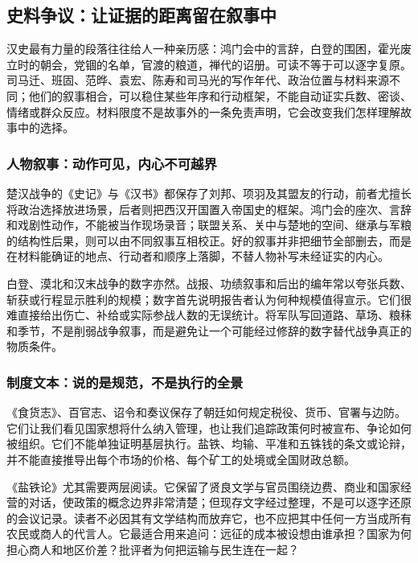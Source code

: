 \subsection{史料争议：让证据的距离留在叙事中}
\label{sec:synthesis-sources}

汉史最有力量的段落往往给人一种亲历感：鸿门会中的言辞，白登的围困，霍光废立时的朝会，党锢的名单，官渡的粮道，禅代的诏册。可读不等于可以逐字复原。司马迁、班固、范晔、袁宏、陈寿和司马光的写作年代、政治位置与材料来源不同；他们的叙事相合，可以稳住某些年序和行动框架，不能自动证实兵数、密谈、情绪或群众反应。材料限度不是故事外的一条免责声明，它会改变我们怎样理解故事中的选择。

\subsubsection{人物叙事：动作可见，内心不可越界}

楚汉战争的《史记》与《汉书》都保存了刘邦、项羽及其盟友的行动，前者尤擅长将政治选择放进场景，后者则把西汉开国置入帝国史的框架。鸿门会的座次、言辞和戏剧性动作，不能被当作现场录音；联盟关系、关中与楚地的空间、继承与军粮的结构性后果，则可以由不同叙事互相校正。好的叙事并非把细节全部删去，而是在材料能确证的地点、行动者和顺序上落脚，不替人物补写未经证实的内心。

白登、漠北和汉末战争的数字亦然。战报、功绩叙事和后出的编年常以夸张兵数、斩获或行程显示胜利的规模；数字首先说明报告者认为何种规模值得宣示。它们很难直接给出伤亡、补给或实际参战人数的无误统计。将军队写回道路、草场、粮秣和季节，不是削弱战争叙事，而是避免让一个可能经过修辞的数字替代战争真正的物质条件。

\subsubsection{制度文本：说的是规范，不是执行的全景}

《食货志》、百官志、诏令和奏议保存了朝廷如何规定税役、货币、官署与边防。它们让我们看见国家想将什么纳入管理，也让我们追踪政策何时被宣布、争论如何被组织。它们不能单独证明基层执行。盐铁、均输、平准和五铢钱的条文或论辩，并不能直接推导出每个市场的价格、每个矿工的处境或全国财政总额。

《盐铁论》尤其需要两层阅读。它保留了贤良文学与官员围绕边费、商业和国家经营的对话，使政策的概念边界非常清楚；但现存文字经过整理，不是可以逐字还原的会议记录。读者不必因其有文学结构而放弃它，也不应把其中任何一方当成所有农民或商人的代言人。它最适合用来追问：远征的成本被设想由谁承担？国家为何担心商人和地区价差？批评者为何把运输与民生连在一起？

